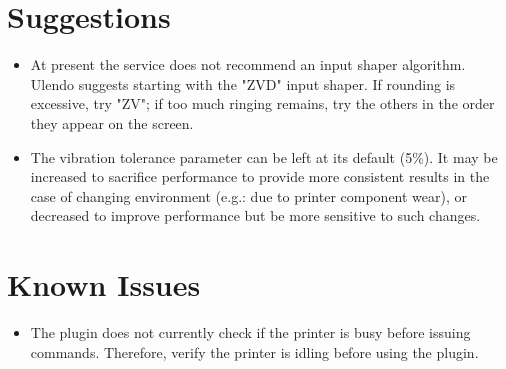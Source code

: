 \documentclass[12pt]{article}
\begin{document}
\section{Suggestions}
\begin{itemize}
	\item At present the service does not recommend an input shaper algorithm. Ulendo suggests starting with the "ZVD" input shaper. If rounding is excessive, try "ZV"; if too much ringing remains, try the others in the order they appear on the screen.
	\item The vibration tolerance parameter can be left at its default (5\%). It may be increased to sacrifice performance to provide more consistent results in the case of changing environment (e.g.: due to printer component wear), or decreased to improve performance but be more sensitive to such changes.
\end{itemize}


\section{Known Issues}
\begin{itemize}
	\item The plugin does not currently check if the printer is busy before issuing commands. Therefore, verify the printer is idling before using the plugin.
\end{itemize}
\end{document}
